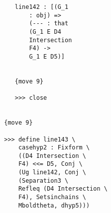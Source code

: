 \documentclass[12pt]{article}
\begin{document}
\begin{verbatim}
                              line142 : [(G_1 
                                  : obj) => 
                                  (--- : that 
                                  (G_1 E D4 
                                  Intersection 
                                  F4) -> 
                                  G_1 E D5)]


                              {move 9}

                              >>> close


                           {move 9}

                           >>> define line143 \
                               casehyp2 : Fixform \
                               ((D4 Intersection \
                               F4) <<= D5, Conj \
                               (Ug line142, Conj \
                               (Separation3 \
                               Refleq (D4 Intersection \
                               F4), Setsinchains \
                               Mboldtheta, dhyp5)))



\end{verbatim}
\end{document}
